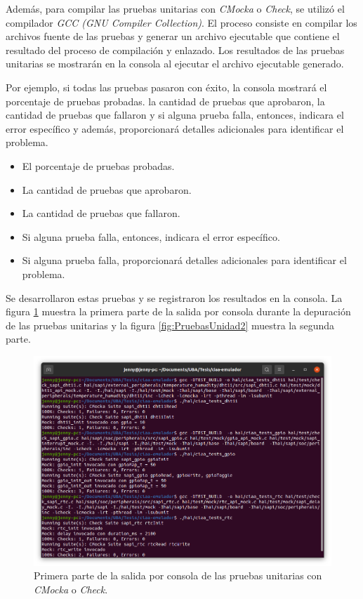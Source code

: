 Además, para compilar las pruebas unitarias con \textit{CMocka} o \textit{Check}, se utilizó el compilador \textit{GCC (GNU Compiler Collection)}. El proceso consiste en compilar los archivos fuente de las pruebas y generar un archivo ejecutable que contiene el resultado del proceso de compilación y enlazado. Los resultados de las pruebas unitarias se mostrarán en la consola al ejecutar el archivo ejecutable generado.

Por ejemplo, si todas las pruebas pasaron con éxito, la consola mostrará el porcentaje de pruebas probadas. la cantidad de pruebas que aprobaron, la cantidad de pruebas que fallaron y si alguna prueba falla, entonces, indicara el error específico y además, proporcionará detalles adicionales para identificar el problema.

\begin{itemize}
	\item El porcentaje de pruebas probadas.
	\item La cantidad de pruebas que aprobaron.
	\item La cantidad de pruebas que fallaron.
	\item Si alguna prueba falla, entonces, indicara el error específico.
	\item Si alguna prueba falla, proporcionará detalles adicionales para identificar el problema.
\end{itemize}

Se desarrollaron estas pruebas y se registraron los resultados en la consola. La figura \ref{fig:PruebasUnidad1} muestra la primera parte de la salida por consola durante la depuración de las pruebas unitarias y la figura \ref{fig:PruebasUnidad2} muestra la segunda parte.

\begin{figure}[ht]
	\centering
	\includegraphics[scale=.27]{./Figures/PruebasUnidad1.png}
	\caption{Primera parte de la salida por consola de las pruebas unitarias con \textit{CMocka} o \textit{Check}.}
	\label{fig:PruebasUnidad1}
\end{figure}


